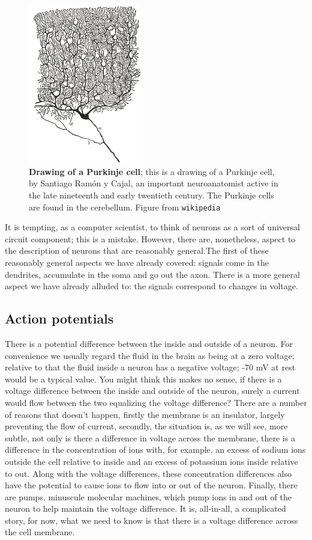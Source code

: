 \documentclass[12pt]{article}
\begin{document}
\begin{figure}[tbhp]
  \begin{center}
  \includegraphics[width=5cm]{PC.png}
\end{center}
  \caption{\textbf{Drawing of a Purkinje cell}; this is a drawing of a
    Purkinje cell, by Santiago Ram\'{o}n y Cajal, an important
    neuroanatomist active in the late nineteenth and early twentieth
    century. The Purkinje cells are found in the cerebellum. Figure from
    \texttt{wikipedia}\label{fig_PC}}
\end{figure}

It is tempting, as a computer scientist, to think of neurons as a sort
of universal circuit component; this is a mistake. However, there are,
nonetheless, aspect to the description of neurons that are reasonably
general.The first of these reasonably general aspects we have already
covered: signals come in the dendrites, accumulate in the soma and go
out the axon. There is a more general aspect we have already alluded
to: the signals correspond to changes in voltage.

\subsection*{Action potentials}

There is a potential difference between the inside and outside of a
neuron. For convenience we usually regard the fluid in the brain as
being at a zero voltage; relative to that the fluid inside a neuron
has a negative voltage; -70 mV at rest would be a typical value. You
might think this makes no sense, if there is a voltage difference
between the inside and outside of the neuron, surely a current would
flow between the two equalizing the voltage difference? There are a
number of reasons that doesn't happen, firstly the membrane is an
insulator, largely preventing the flow of current, secondly, the
situation is, as we will see, more subtle, not only is there a
difference in voltage across the membrane, there is a difference in
the concentration of ions with, for example, an excess of sodium ions
outside the cell relative to inside and an excess of potassium ions
inside relative to out. Along with the voltage differences, these
concentration differences also have the potential to cause ions to
flow into or out of the neuron. Finally, there are pumps, minuscule
molecular machines, which pump ions in and out of the neuron to help
maintain the voltage difference. It is, all-in-all, a complicated
story, for now, what we need to know is that there is a voltage
difference across the cell membrane.
\end{document}

